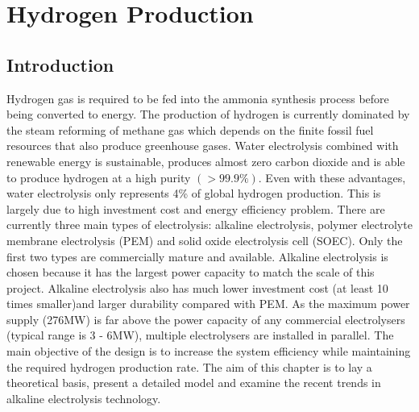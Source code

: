 


% 

\section{Hydrogen Production}
\subsection{Introduction} 


Hydrogen gas is required to be fed into the ammonia synthesis process before being converted to energy. The production of hydrogen is currently dominated by the steam reforming of methane gas which depends on the finite fossil fuel resources that also produce greenhouse gases. Water electrolysis combined with renewable energy is sustainable, produces almost zero carbon dioxide and is able to produce hydrogen at a high purity $(>99.9\%)$. Even with these advantages, water electrolysis only represents 4\% of global hydrogen production. This is largely due to high investment cost and energy efficiency problem. There are currently three main types of electrolysis: alkaline electrolysis, polymer electrolyte membrane electrolysis (PEM) and solid oxide electrolysis cell (SOEC). Only the first two types are commercially mature and available. Alkaline electrolysis is chosen because it has the largest power capacity to match the scale of this project. Alkaline electrolysis also has much lower investment cost (at least 10 times smaller)and larger durability compared with PEM. As the maximum power supply (276MW) is far above the power capacity of any commercial electrolysers (typical range is 3 - 6MW), multiple electrolysers are installed in parallel.
The main objective of the design is to increase the system efficiency while maintaining the required hydrogen production rate. The aim of this chapter is to lay a theoretical basis, present a detailed model  and examine the recent trends in alkaline electrolysis technology. 

